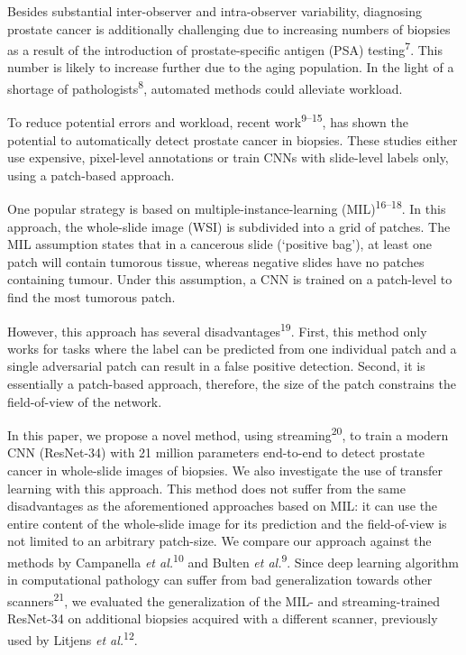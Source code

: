 \documentclass[
  12pt,
  a5,margin=2cmpaper,
]{article}
\begin{document}
Besides substantial inter-observer and intra-observer variability,
diagnosing prostate cancer is additionally challenging due to increasing
numbers of biopsies as a result of the introduction of prostate-specific
antigen (PSA) testing\textsuperscript{7}. This number is likely to
increase further due to the aging population. In the light of a shortage
of pathologists\textsuperscript{8}, automated methods could alleviate
workload.

To reduce potential errors and workload, recent
work\textsuperscript{9--15}, has shown the potential to automatically
detect prostate cancer in biopsies. These studies either use expensive,
pixel-level annotations or train CNNs with slide-level labels only,
using a patch-based approach.

One popular strategy is based on multiple-instance-learning
(MIL)\textsuperscript{16--18}. In this approach, the whole-slide image
(WSI) is subdivided into a grid of patches. The MIL assumption states
that in a cancerous slide (`positive bag'), at least one patch will
contain tumorous tissue, whereas negative slides have no patches
containing tumour. Under this assumption, a CNN is trained on a
patch-level to find the most tumorous patch.

However, this approach has several disadvantages\textsuperscript{19}.
First, this method only works for tasks where the label can be predicted
from one individual patch and a single adversarial patch can result in a
false positive detection. Second, it is essentially a patch-based
approach, therefore, the size of the patch constrains the field-of-view
of the network.

In this paper, we propose a novel method, using
streaming\textsuperscript{20}, to train a modern CNN (ResNet-34) with 21
million parameters end-to-end to detect prostate cancer in whole-slide
images of biopsies. We also investigate the use of transfer learning
with this approach. This method does not suffer from the same
disadvantages as the aforementioned approaches based on MIL: it can use
the entire content of the whole-slide image for its prediction and the
field-of-view is not limited to an arbitrary patch-size. We compare our
approach against the methods by Campanella \emph{et
al.}\textsuperscript{10} and Bulten \emph{et al.}\textsuperscript{9}.
Since deep learning algorithm in computational pathology can suffer from
bad generalization towards other scanners\textsuperscript{21}, we
evaluated the generalization of the MIL- and streaming-trained ResNet-34
on additional biopsies acquired with a different scanner, previously
used by Litjens \emph{et al.}\textsuperscript{12}.
\end{document}
